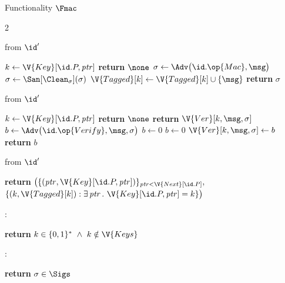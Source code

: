 \begin{interface}[nofloat]{Functionality $\Fmac$ \\
\params{$\PID$, \quad $\Ps$, \quad $\admits$, \quad
$\uses := \{(\Adv,\serves)\}$, \quad $\pars := \none$}}
{\begin{multicols}{2}
\columnbreak

 \quad from $\id'$
\begin{algorithmic}[1]
\algcont
\State $k \gets \V{Key}[\id.P, \mathit{ptr}]$
  \State \textbf{return} $\none$
\EndIf
\State $\sigma \gets \Adv\bigl(\id.\op{Mac}, \msg\bigr)$
\State $\sigma \gets \San[\Clean_{\sigma}](\sigma)$
  \State $\V{Tagged}[k] \gets \V{Tagged}[k] \cup \{\msg\}$
\EndIf
\State \textbf{return} $\sigma$
\algsave
\end{algorithmic}
\vspace{1.4ex}

 \quad from $\id'$
\begin{algorithmic}[1]
\algcont
\State $k \gets \V{Key}[\id.P, \mathit{ptr}]$
  \State \textbf{return} $\none$
\EndIf
{}
  \State \textbf{return} $\V{Ver}[k, \msg, \sigma]$
\EndIf
\State $b \gets \Adv\bigl(\id.\op{Verify}, \msg, \sigma\bigr)$
  \State $b \gets 0$
\EndIf
{}
  \State $b \gets 0$
\EndIf
\State $\V{Ver}[k, \msg, \sigma] \gets b$
\State \textbf{return} $b$
\algsave
\end{algorithmic}
\vspace{1.4ex}

 \quad from $\id'$
\begin{algorithmic}[1]
\algcont
\State \textbf{return} $\bigl(\{(\mathit{ptr}, \V{Key}[\id.P, \mathit{ptr}])\}_{\mathit{ptr} < \V{Next}[\id.P]},$
\Statex \quad\ $\{(k, \V{Tagged}[k]) : \exists\, \mathit{ptr}\, .\ \V{Key}[\id.P,\mathit{ptr}] = k\}\bigr)$
\algsave
\end{algorithmic}
\vspace{1.4ex}

:
\begin{algorithmic}[1]
\algcont
\State \textbf{return} $k \in \{0,1\}^{*} \ \wedge\ k \notin \V{Keys}$
\algsave
\end{algorithmic}
\vspace{1.4ex}

\opsig{$\Clean_{\sigma}(\sigma)$}:
\begin{algorithmic}[1]
\algcont
\State \textbf{return} $\sigma \in \Sigs$
\algsave
\end{algorithmic}
\end{multicols}}
\end{interface}

